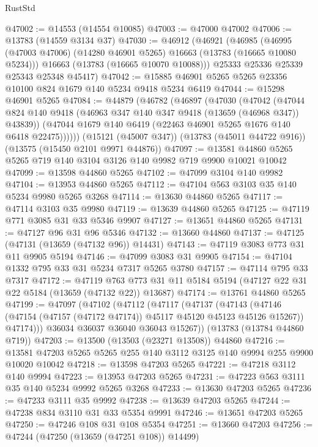 \begin{lexlean}{RustStd}
\begin{coremodule}
@47002 := @14553 (@14554 @10085)
@47003 := @47000 @47002
@47006 := @13783 (@14559 @3134 @37)
@47030 := @46912
    (@46921
      (@46985
        (@46995 (@47003 @47006) (@14280 @46901 @5265) @16663 (@13783 (@16665 @10080 @5234)))
        @16663
        (@13783 (@16665 @10070 @10088)))
      @25333
      @25336
      @25339
      @25343
      @25348
      @45417)
@47042 := @15885 @46901 @5265 @5265 @23356 @10100 @824 @1679 @140 @5234 @9418 @5234 @6419
@47044 := @15298 @46901 @5265
@47084 := @44879
    (@46782
      (@46897
        (@47030
          (@47042
            (@47044 @824 @140 @9418 (@46963 @347 @140 @347 @9418 (@13659 (@46968 @347)) @43839))
            (@47044 @1679 @140 @6419 (@22463 @46901 @5265 @1676 @140 @6418 @22475))))))
    (@15121 (@45007 @347))
    (@13783 (@45011 @44722 @916))
    (@13575 (@15450 @2101 @9971 @44876))
@47097 := @13581 @44860 @5265 @5265 @719 @140 @3104 @3126 @140 @9982 @719 @9900 @10021 @10042
@47099 := @13598 @44860 @5265
@47102 := @47099 @3104 @140 @9982
@47104 := @13953 @44860 @5265
@47112 := @47104 @563 @3103 @35 @140 @5234 @9980 @5265 @3268
@47114 := @13630 @44860 @5265
@47117 := @47114 @3103 @35 @9980
@47119 := @13639 @44860 @5265
@47125 := @47119 @771 @3085 @31 @33 @5346 @9907
@47127 := @13651 @44860 @5265
@47131 := @47127 @96 @31 @96 @5346
@47132 := @13660 @44860
@47137 := @47125 (@47131 (@13659 (@47132 @96)) @14431)
@47143 := @47119 @3083 @773 @31 @11 @9905 @5194
@47146 := @47099 @3083 @31 @9905
@47154 := @47104 @1332 @795 @33 @31 @5234 @7317 @5265 @3780
@47157 := @47114 @795 @33 @7317
@47172 := @47119
    @763
    @773
    @31
    @11
    @5184
    @5194
    (@47127 @22 @31 @22 @5184 (@13659 (@47132 @22)) @13687)
@47174 := @13761 @44860 @5265
@47199 := @47097
    (@47102
      (@47112
        (@47117
          (@47137
            (@47143
              (@47146 (@47154 (@47157 (@47172 @47174)) @45117 @45120 @45123 @45126 @15267))
              @47174)))
        @36034
        @36037
        @36040
        @36043
        @15267))
    (@13783 (@13784 @44860 @719))
@47203 := @13500 (@13503 (@23271 @13508)) @44860
@47216 := @13581 @47203 @5265 @5265 @255 @140 @3112 @3125 @140 @9994 @255 @9900 @10020 @10042
@47218 := @13598 @47203 @5265
@47221 := @47218 @3112 @140 @9994
@47223 := @13953 @47203 @5265
@47231 := @47223 @563 @3111 @35 @140 @5234 @9992 @5265 @3268
@47233 := @13630 @47203 @5265
@47236 := @47233 @3111 @35 @9992
@47238 := @13639 @47203 @5265
@47244 := @47238 @834 @3110 @31 @33 @5354 @9991
@47246 := @13651 @47203 @5265
@47250 := @47246 @108 @31 @108 @5354
@47251 := @13660 @47203
@47256 := @47244 (@47250 (@13659 (@47251 @108)) @14499)

\end{coremodule}
\end{lexlean}
